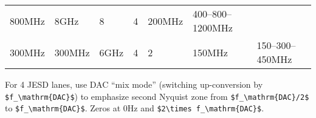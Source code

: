 \begin{longtable}[]{@{}lllllll@{}}
\begin{minipage}[t]{0.15\columnwidth}
800MHz\strut
\end{minipage} & \begin{minipage}[t]{0.09\columnwidth}\raggedright\strut
8GHz\strut
\end{minipage} & \begin{minipage}[t]{0.06\columnwidth}\raggedright\strut
8\strut
\end{minipage} & \begin{minipage}[t]{0.07\columnwidth}\raggedright\strut
4\strut
\end{minipage} & \begin{minipage}[t]{0.14\columnwidth}\raggedright\strut
200MHz\strut
\end{minipage} & \begin{minipage}[t]{0.14\columnwidth}\raggedright\strut
400--800--1200MHz\strut
\end{minipage}\tabularnewline
\begin{minipage}[t]{0.14\columnwidth}\raggedright\strut
	300MHz\strut
\end{minipage} & \begin{minipage}[t]{0.15\columnwidth}\raggedright\strut
300MHz\strut
\end{minipage} & \begin{minipage}[t]{0.09\columnwidth}\raggedright\strut
6GHz\strut
\end{minipage} & \begin{minipage}[t]{0.06\columnwidth}\raggedright\strut
4\strut
\end{minipage} & \begin{minipage}[t]{0.07\columnwidth}\raggedright\strut
2\strut
\end{minipage} & \begin{minipage}[t]{0.14\columnwidth}\raggedright\strut
150MHz\strut
\end{minipage} & \begin{minipage}[t]{0.14\columnwidth}\raggedright\strut
150--300--450MHz\strut
\end{minipage}\tabularnewline

\end{longtable}

For 4 JESD lanes, use DAC ``mix mode'' (switching up-conversion by
\texttt{\$f\_\textbackslash{}mathrm\{DAC\}\$}) to emphasize second
Nyquist zone from \texttt{\$f\_\textbackslash{}mathrm\{DAC\}/2\$} to
\texttt{\$f\_\textbackslash{}mathrm\{DAC\}\$}. Zeros at 0Hz and
\texttt{\$2\textbackslash{}times\ f\_\textbackslash{}mathrm\{DAC\}\$}.